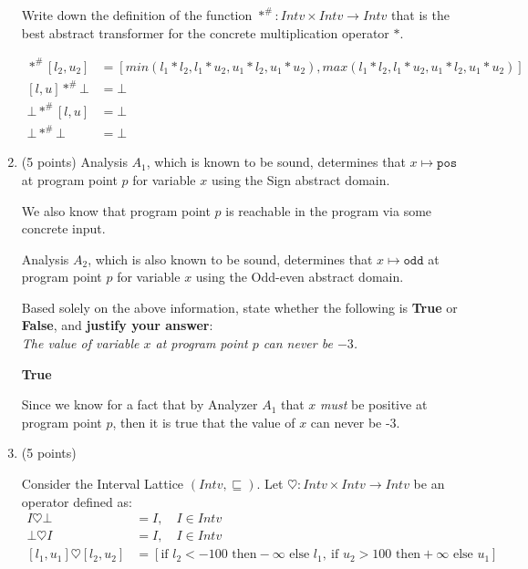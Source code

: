 \documentclass[12pt]{article}
\begin{document}
\begin{enumerate}
Write down the definition of the function $*^{\#} \colon Intv \times Intv \to Intv$
that is the best abstract transformer for the concrete multiplication operator $*$.

\begin{mdframed}
  \begin{align*}
  [l_1, u_1] *^{\#} [l_2, u_2] &= [min(l_1 * l_2, l_1 * u_2, u_1*l_2, u_1*u_2 ), 
  max(l_1 * l_2, l_1 * u_2, u_1*l_2, u_1*u_2 )] \\
  [l, u] *^{\#} \bot &= \bot \\ 
  \bot *^{\#} [l, u] &= \bot \\ 
  \bot *^{\#} \bot &= \bot 
\end{align*}

\end{mdframed}

\newpage

\item  (5 points)
Analysis $A_1$, which is known to be sound, determines that
$x \mapsto \texttt{pos}$ 
at program point $p$ for variable $x$ using the Sign abstract domain. 

We also know that program point $p$ is reachable in the program via some
concrete input.

Analysis $A_2$, which is also known to be sound, determines that 
 $x \mapsto \texttt{odd}$ 
at program point $p$ for variable $x$ using the Odd-even abstract domain. 

Based solely on the above information, state whether the following is \textbf{True} or \textbf{False},
and \textbf{justify your answer}: \\
\emph{The value of variable $x$ at program point $p$ can never be $-3$.}
\begin{mdframed}
\textbf{True} 

Since we know for a fact that by Analyzer $A_1$ that $x$ \textit{must} be positive at program point $p$, then it is true that the value of $x$ can never be -3.

\end{mdframed}

\newpage


\item  (5 points)

  Consider the Interval Lattice $(Intv, \sqsubseteq)$.
  Let $\heartsuit: Intv \times Intv \to Intv$ be an operator 
   defined as: 
   \begin{align*}
   I \heartsuit \bot &= I, \hspace{1em} I \in Intv \\
   \bot \heartsuit I &= I,\hspace{1em} I \in Intv\\
   [l_1, u_1] \heartsuit [l_2, u_2] &= [\text{if } l_2 < -100 \text { then} -\!\infty \text{ else } l_1,\ 
                                        \text{if } u_2 > 100 \text { then} +\!\infty \text{ else } u_1]
   \end{align*}                                       
   

\end{enumerate}
\end{document}
